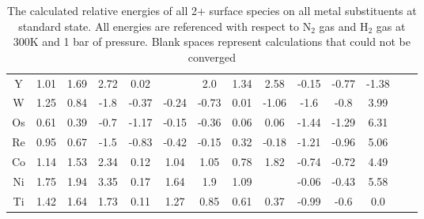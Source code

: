 \documentclass[journal=jacsat,manuscript=article]{achemso}
\begin{document}
\begin{table}
\begin{center}
\begin{tabular}{| c | c | c | c | c | c | c | c | c | c | c | c | c | c |}
Y & 1.01 & 1.69 & 2.72 & 0.02 &  & 2.0 & 1.34 & 2.58 & -0.15 & -0.77 & -1.38 \\
W & 1.25 & 0.84 & -1.8 & -0.37 & -0.24 & -0.73 & 0.01 & -1.06 & -1.6 & -0.8 & 3.99 \\
Os & 0.61 & 0.39 & -0.7 & -1.17 & -0.15 & -0.36 & 0.06 & 0.06 & -1.44 & -1.29 & 6.31 \\
Re & 0.95 & 0.67 & -1.5 & -0.83 & -0.42 & -0.15 & 0.32 & -0.18 & -1.21 & -0.96 & 5.06 \\
Co & 1.14 & 1.53 & 2.34 & 0.12 & 1.04 & 1.05 & 0.78 & 1.82 & -0.74 & -0.72 & 4.49 \\
Ni & 1.75 & 1.94 & 3.35 & 0.17 & 1.64 & 1.9 & 1.09 &  & -0.06 & -0.43 & 5.58 \\
Ti & 1.42 & 1.64 & 1.73 & 0.11 & 1.27 & 0.85 & 0.61 & 0.37 & -0.99 & -0.6 & 0.0 \\
\hline
\end{tabular}
\end{center}
\caption{The calculated relative energies of all 2+ surface species on all metal substituents at standard state. All energies are referenced with respect to N$_2$ gas and H$_2$ gas at 300K and 1 bar of pressure. Blank spaces represent calculations that could not be converged}
\label{table:energies}
\end{table}
\end{document}
